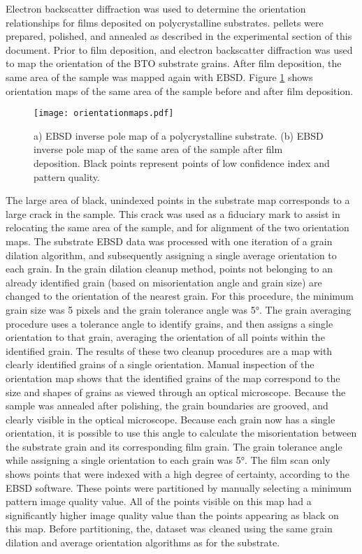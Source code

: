 Electron backscatter diffraction was used to determine the orientation relationships for  films deposited on polycrystalline  substrates.  pellets were prepared, polished, and annealed as described in the experimental section of this document. Prior to film deposition, and electron backscatter diffraction was used to map the orientation of the BTO substrate grains. After film deposition, the same area of the sample was mapped again with EBSD. Figure \ref{fig:orientationmaps} shows orientation maps of the same area of the sample before and after film deposition.%
\begin{figure}
	\texttt{[image: orientationmaps.pdf]}
		\caption[EBSD maps of substrate and film]{%
			a) EBSD inverse pole map of a polycrystalline  substrate. 
			(b) EBSD inverse pole map of the same area of the sample after 
			 film deposition. Black points represent points of low 
			confidence index and pattern quality.}
	\label{fig:orientationmaps}
\end{figure}
The large area of black, unindexed points in the substrate map corresponds to a large crack in the sample. This crack was used as a fiduciary mark to assist in relocating the same area of the sample, and for alignment of the two orientation maps. The substrate EBSD data was processed with one iteration of a grain dilation algorithm, and subsequently assigning a single average orientation to each grain. In the grain dilation cleanup method, points not belonging to an already identified grain (based on misorientation angle and grain size) are changed to the orientation of the nearest grain.  For this procedure, the minimum grain size was 5 pixels and the grain tolerance angle was 5\si{\degree}. The grain averaging procedure uses a tolerance angle to identify grains, and then assigns a single orientation to that grain, averaging the orientation of all points within the identified grain. The results of these two cleanup procedures are a map with clearly identified grains of a single orientation. Manual inspection of the orientation map shows that the identified grains of the map correspond to the size and shapes of grains as viewed through an optical microscope. Because the sample was annealed after polishing, the grain boundaries are grooved, and clearly visible in the optical microscope. Because each grain now has a single orientation, it is possible to use this angle to calculate the misorientation between the substrate grain and its corresponding film grain. The grain tolerance angle while assigning a single orientation to each grain was 5\si{\degree}. The film scan only shows points that were indexed with a high degree of certainty, according to the EBSD software. These points were partitioned by manually selecting a minimum pattern image quality value. All of the points visible on this map had a significantly higher image quality value than the points appearing as black on this map. Before partitioning, the, dataset was cleaned using the same grain dilation and average orientation algorithms as for the substrate. 


